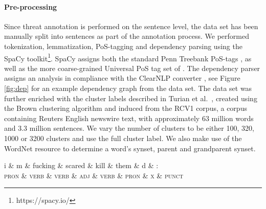 \documentclass[11pt,letterpaper]{article}
\let\tag=\textsc
\begin{document}
\paragraph{Pre-processing}Since threat annotation is performed on the sentence level, the data
set has been manually split into sentences as part of the annotation
process.  We performed tokenization, lemmatization, PoS-tagging and
dependency parsing using the SpaCy
toolkit\footnote{https://spacy.io/}.  SpaCy assigns both the standard
Penn Treebank PoS-tags \cite{Mar:San:Mar:93}, as well as the more
coarse-grained Universal PoS tag set of . The
dependency parser assigns an analysis in compliance with the ClearNLP
converter \cite{Cho:Pal:12}, see Figure \ref{fig:dep} for an example
dependency graph from the data set. The data set was further enriched
with the cluster labels described in Turian et
al.~, created using the Brown clustering
algorithm \cite{Bro:deS:Mer:92} and induced from the RCV1 corpus, a
corpus containing Reuters English newswire text, with approximately 63
million words and 3.3 million sentences. We vary the number of
clusters to be either 100, 320, 1000 or 3200 clusters and use the full
cluster label.  We also make use of the WordNet resource
\cite{wordnet} to determine a word's synset, parent and grandparent
synset.

\begin{figure*}
\begin{center}
\begin{dependency}
  \begin{deptext}[column sep=.2cm]
    i \& m \& fucking \& scared \& kill \& them \& d \& : \\
   \tag{\smaller pron} \& \tag{\smaller verb} \& \tag{\smaller verb} \& \tag{\smaller adj} \& \tag{\smaller verb} \& \tag{\smaller pron} \& \tag{\smaller x} \& \tag{\smaller punct} \\
  \end{deptext}
\end{dependency}
\caption{Dependency parse of example sentence from the data set, with assigned uPOS tags.}
\label{fig:dep}
\end{center}
\end{figure*}
\end{document}
